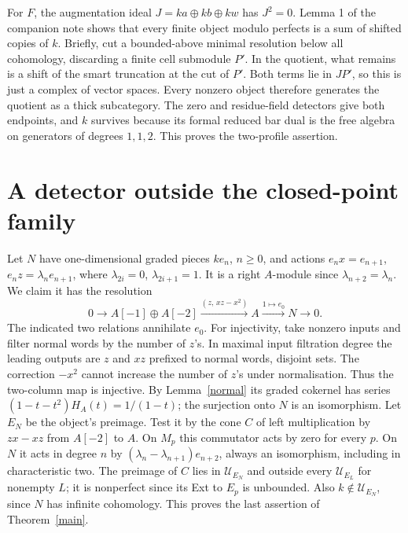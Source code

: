 \documentclass[11pt]{article}
\newcommand{\UU}{\mathcal U}
\begin{document}
For $F$, the augmentation ideal $J=ka\oplus kb\oplus kw$ has $J^2=0$.
Lemma 1 of the companion note shows that every finite object modulo
perfects is a sum of shifted copies of $k$. Briefly, cut a bounded-above
minimal resolution below all cohomology, discarding a finite cell
submodule $P'$. In the quotient, what remains is a shift of the smart
truncation at the cut of $P'$. Both terms lie in $JP'$, so this is just
a complex of vector spaces. Every nonzero object therefore generates the
quotient as a thick subcategory. The zero and residue-field detectors
give both endpoints, and $k$ survives because its formal reduced bar
dual is the free algebra on generators of degrees $1,1,2$. This proves
the two-profile assertion.

\section{A detector outside the closed-point family}
Let $N$ have one-dimensional graded pieces $k e_n$, $n\ge0$,
and actions $e_n x=e_{n+1}$, $e_n z=\lambda_n e_{n+1}$, where
$\lambda_{2i}=0$, $\lambda_{2i+1}=1$. It is a right $A$-module since
$\lambda_{n+2}=\lambda_n$. We claim it has the resolution
\[
 0\longrightarrow A[-1]\oplus A[-2]
 \xrightarrow{(z,\,xz-x^2)}A\xrightarrow{1\mapsto e_0}N\longrightarrow0.
\]
The indicated two relations annihilate $e_0$. For injectivity, take
nonzero inputs and filter normal words by the number of $z$'s. In maximal
input filtration degree the leading outputs are $z$ and $xz$ prefixed to
normal words, disjoint sets. The correction $-x^2$ cannot increase the
number of $z$'s under normalisation. Thus the two-column map is injective.
By Lemma~\ref{normal} its graded cokernel has series
$(1-t-t^2)H_A(t)=1/(1-t)$; the surjection onto $N$ is an isomorphism.
Let $E_N$ be the object's preimage. Test it by the cone $C$ of left
multiplication by $zx-xz$ from $A[-2]$ to $A$. On $M_p$ this commutator
acts by zero for every $p$. On $N$ it acts in degree $n$ by
$(\lambda_n-\lambda_{n+1})e_{n+2}$, always an isomorphism, including
in characteristic two. The preimage of $C$ lies in $\UU_{E_N}$ and
outside every $\UU_{E_L}$ for nonempty $L$; it is nonperfect since
its Ext to $E_p$ is unbounded. Also $k\notin\UU_{E_N}$, since $N$ has
infinite cohomology. This proves the last assertion of Theorem~\ref{main}.
\end{document}

